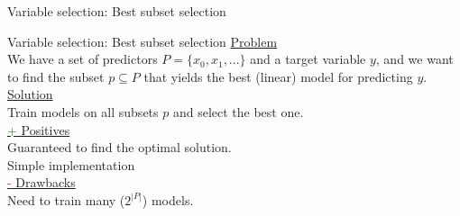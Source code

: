 \documentclass[8pt]{beamer}
\begin{document}
\begin{frame}[t,fragile]{Variable selection: Best subset selection}

    \end{frame}

     \begin{frame}[t]{Variable selection: Best subset selection} %
        \underline{Problem}\\
        We have a set of predictors $P=\{x_0, x_1, ...\}$ and a target variable $y$, and we want to find the subset $p \subseteq P$ that yields the best (linear) model for predicting $y$.\\
        \vspace{0.25cm}
        \underline{Solution}\\
        Train models on all subsets $p$ and select the best one.\\
        \vspace{0.25cm}
        \underline{\textcolor{green}{+} Positives}\\
        Guaranteed to find the optimal solution.\\
        Simple implementation\\
        \vspace{0.25cm}
        \underline{\textcolor{red}{-} Drawbacks}\\
        Need to train many ($2^{|P|}$) models.
     \end{frame}
\end{document}
